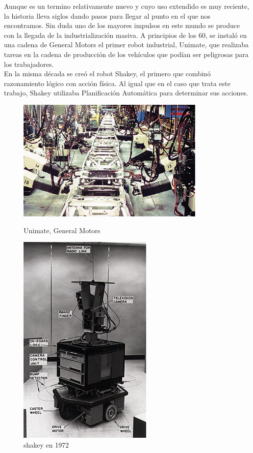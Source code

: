 Aunque es un termino relativamente nuevo y cuyo uso extendido es muy reciente, la historia lleva siglos dando pasos para llegar al punto en el que nos encontramos. Sin duda uno de los mayores impulsos en este mundo se produce con la llegada de la industrialización masiva. A principios de los 60, se instaló en una cadena de General Motors el primer robot industrial, Unimate, que realizaba tareas en la cadena de producción de los vehículos que podían ser peligrosas para los trabajadores.\\

En la misma década se creó el robot Shakey, el primero que combinó razonamiento lógico con acción física. Al igual que en el caso que trata este trabajo, Shakey utilizaba Planificación Automática para determinar sus acciones.\\

\begin{figure}[!htb]
	\begin{minipage}{0.48\textwidth}
    	\centering
     	\includegraphics[scale=0.6]{img/unimate.jpg}
  		\caption{Unimate, General Motors}
  		\label{fig:unimate}
   	\end{minipage}\hfill
   	\begin {minipage}{0.48\textwidth}
     	\centering
     	\includegraphics[scale=0.6]{img/shakey.jpg}
     	\caption{shakey en 1972}
     	\label{fig:shakey}
	\end{minipage}
\end{figure}

